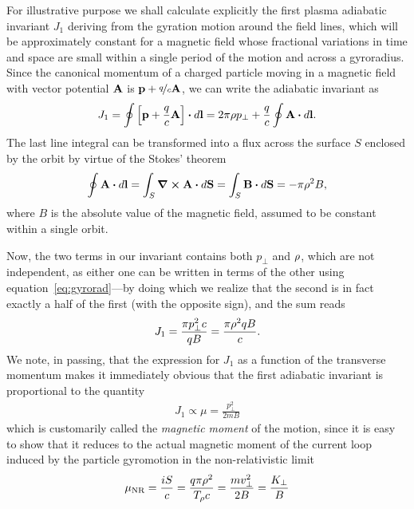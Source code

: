 For illustrative purpose we shall calculate explicitly the first plasma adiabatic
invariant $J_1$ deriving from the gyration motion around the field lines, which
will be approximately constant for a magnetic field whose fractional variations
in time and space are small within a single period of the motion and across a gyroradius.
Since the canonical momentum of a charged particle moving in a magnetic field with
vector potential $\vb{A}$ is $\vb{p} + \nicefrac{q}{c} \vb{A}$, we can write the
adiabatic invariant as
\begin{align}
  J_1 = \oint \qty[\vb{p} + \frac{q}{c} \vb{A}] \dotproduct d\vb{l} =
  2\pi\gyrorad p_\perp + \frac{q}{c} \oint \vb{A} \dotproduct d\vb{l}.
\end{align}
The last line integral can be transformed into a flux across the surface $S$ enclosed
by the orbit by virtue of the Stokes' theorem
\begin{align*}
  \oint \vb{A} \dotproduct d\vb{l} = \int_S \curl{\vb{A}} \dotproduct d\vb{S} =
  \int_S \vb{B} \dotproduct d\vb{S} = -\pi \gyrorad^2 B,
\end{align*}
where $B$ is the absolute value of the magnetic field, assumed to be constant within
a single orbit.

Now, the two terms in our invariant contains both $p_\perp$ and $\rho$, which
are not independent, as either one can be written in terms of the other using
equation~\eqref{eq:gyrorad}---by doing which we realize that the second is in fact
exactly a half of the first (with the opposite sign), and the sum reads
\begin{align}
  J_1 = \frac{\pi p_\perp^2 c}{qB} = \frac{\pi \rho^2 qB}{c}.
\end{align}
We note, in passing, that the expression for $J_1$ as a function of the transverse
momentum makes it immediately obvious that the first adiabatic invariant is
proportional to the quantity
\begin{align*}
  J_1 \propto \mu = \frac{p_\perp^2}{2mB}
\end{align*}
which is customarily called the \emph{magnetic moment} of the motion, since it is
easy to show that it reduces to the actual magnetic moment of the current loop
induced by the particle gyromotion in the non-relativistic limit
\begin{align*}
  \mu_\text{NR} = \frac{iS}{c} = \frac{q \pi \rho^2}{T_{\rho} c} =
  \frac{m v_\perp^2 }{2 B} = \frac{K_\perp}{B}
\end{align*}

